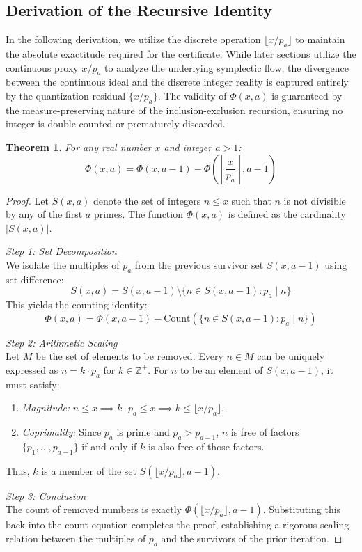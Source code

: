 \documentclass[sn-mathphys-num, pdflatex]{sn-jnl}
\newtheorem{theorem}{Theorem}[section]
\begin{document}
\subsection{Derivation of the Recursive Identity}
In the following derivation, we utilize the discrete operation $\lfloor x/p_a \rfloor$ to maintain the absolute exactitude required for the certificate. While later sections utilize the continuous proxy $x/p_a$ to analyze the underlying symplectic flow, the divergence between the continuous ideal and the discrete integer reality is captured entirely by the quantization residual $\{x/p_a\}$. The validity of  $\Phi(x,a)$ is guaranteed by the measure-preserving nature of the inclusion-exclusion recursion, ensuring no integer is double-counted or prematurely discarded.

\begin{theorem} For any real number $x$ and integer $a > 1$:
\[ \Phi(x, a) = \Phi(x, a-1) - \Phi\left( \left\lfloor \frac{x}{p_a} \right\rfloor, a-1 \right) \]
\end{theorem}
\begin{proof}
Let $S(x, a)$ denote the set of integers $n \le x$ such that $n$ is not divisible by any of the first $a$ primes. The function $\Phi(x, a)$ is defined as the cardinality $|S(x, a)|$.

\textit{Step 1: Set Decomposition}\\
We isolate the multiples of $p_a$ from the previous survivor set $S(x, a-1)$ using set difference:
\[ S(x, a) = S(x, a-1) \setminus \{ n \in S(x, a-1) : p_a \mid n \} \]
This yields the counting identity:
\[ \Phi(x, a) = \Phi(x, a-1) - \text{Count} \left( \{ n \in S(x, a-1) : p_a \mid n \} \right) \]

\textit{Step 2: Arithmetic Scaling}\\
Let $M$ be the set of elements to be removed. Every $n \in M$ can be uniquely expressed as $n = k \cdot p_a$ for $k \in \mathbb{Z}^+$. For $n$ to be an element of $S(x, a-1)$, it must satisfy:
\begin{enumerate}
    \item \textit{Magnitude:} $n \le x \implies k \cdot p_a \le x \implies k \le \lfloor x/p_a \rfloor$.
    \item \textit{Coprimality:} Since $p_a$ is prime and $p_a > p_{a-1}$, $n$ is free of factors $\{p_1, \dots, p_{a-1}\}$ if and only if $k$ is also free of those factors. 
\end{enumerate}
Thus, $k$ is a member of the set $S(\lfloor x/p_a \rfloor, a-1)$.

\textit{Step 3: Conclusion}\\
The count of removed numbers is exactly $\Phi(\lfloor x/p_a \rfloor, a-1)$. Substituting this back into the count equation completes the proof, establishing a rigorous scaling relation between the multiples of $p_a$ and the survivors of the prior iteration.
\end{proof}
\end{document}
